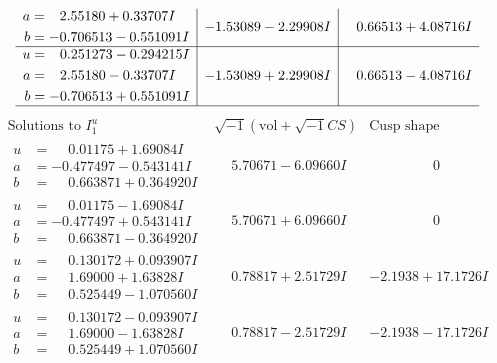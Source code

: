 \documentclass[1p]{elsarticle_modified}
\theoremstyle{definition}
\newcommand{\I}{\sqrt{-1}}
\begin{document}
$$\begin{array}{c|c|c}
\begin{aligned}
a &= \phantom{-}2.55180 + 0.33707 I \\
b &= -0.706513 - 0.551091 I\end{aligned}
 & -1.53089 - 2.29908 I & \phantom{-}0.66513 + 4.08716 I \\ \hline\begin{aligned}
u &= \phantom{-}0.251273 - 0.294215 I \\
a &= \phantom{-}2.55180 - 0.33707 I \\
b &= -0.706513 + 0.551091 I\end{aligned}
 & -1.53089 + 2.29908 I & \phantom{-}0.66513 - 4.08716 I\\
 \hline 
 \end{array}$$\newpage$$\begin{array}{c|c|c}  
\text{Solutions to }I^u_{1}& \I (\text{vol} + \sqrt{-1}CS) & \text{Cusp shape}\\
 \hline 
\begin{aligned}
u &= \phantom{-}0.01175 + 1.69084 I \\
a &= -0.477497 - 0.543141 I \\
b &= \phantom{-}0.663871 + 0.364920 I\end{aligned}
 & \phantom{-}5.70671 - 6.09660 I & \phantom{-0.000000 } 0 \\ \hline\begin{aligned}
u &= \phantom{-}0.01175 - 1.69084 I \\
a &= -0.477497 + 0.543141 I \\
b &= \phantom{-}0.663871 - 0.364920 I\end{aligned}
 & \phantom{-}5.70671 + 6.09660 I & \phantom{-0.000000 } 0 \\ \hline\begin{aligned}
u &= \phantom{-}0.130172 + 0.093907 I \\
a &= \phantom{-}1.69000 + 1.63828 I \\
b &= \phantom{-}0.525449 - 1.070560 I\end{aligned}
 & \phantom{-}0.78817 + 2.51729 I & -2.1938 + 17.1726 I \\ \hline\begin{aligned}
u &= \phantom{-}0.130172 - 0.093907 I \\
a &= \phantom{-}1.69000 - 1.63828 I \\
b &= \phantom{-}0.525449 + 1.070560 I\end{aligned}
 & \phantom{-}0.78817 - 2.51729 I & -2.1938 - 17.1726 I \\ \hline\begin{aligned}

\end{aligned}
\end{array}$$
\end{document}
